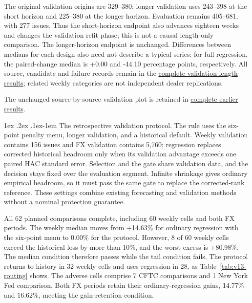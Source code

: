 \documentclass[10pt,a4paper]{article}
\makeatletter
\renewcommand\paragraph{\@startsection{paragraph}{4}{\z@}%
  {1ex \@plus .2ex \@minus .1ex}{-1em}%
  {\normalfont\normalsize\bfseries}}
\makeatother
\begin{document}
The original validation origins are 329--380; longer validation uses 243--398 at the short horizon and 225--380 at the longer horizon. Evaluation remains 405--681, with 277 issues. Thus the short-horizon endpoint also advances eighteen weeks and changes the validation refit phase; this is not a causal length-only comparison. The longer-horizon endpoint is unchanged. Differences between medians for each design also need not describe a typical series: for full regression, the paired-change median is +0.00 and -44.10 percentage points, respectively. All source, candidate and failure records remain in the \href{https://github.com/ByronLi0207/financial-mathematics-paper-20261020/tree/revision-v13/results/v13/nyfed-validation}{complete validation-length results}; related weekly categories are not independent dealer replications.

The unchanged source-by-source validation plot is retained in \href{https://github.com/ByronLi0207/financial-mathematics-paper-20261020/blob/submission-final/EXTENDED_RESULTS.md#asmbi-extended-s38}{complete earlier results}.


\FloatBarrier
\paragraph{The retrospective validation protocol.}
The rule uses the six-point penalty menu, longer validation, and a historical default. Weekly validation contains 156 issues and FX validation contains 5,760; regression replaces corrected historical headroom only when its validation advantage exceeds one paired HAC standard error. Selection and the gate share validation data, and the decision stays fixed over the evaluation segment. Infinite shrinkage gives ordinary empirical headroom, so it must pass the same gate to replace the corrected-rank reference. These settings combine existing forecasting and validation methods without a nominal protection guarantee.

All 62 planned comparisons complete, including 60 weekly cells and both FX periods. The weekly median moves from +14.63\% for ordinary regression with the six-point menu to 0.00\% for the protocol. However, 8 of 60 weekly cells exceed the historical loss by more than 10\%, and the worst excess is +80.98\%. The median condition therefore passes while the tail condition fails. The protocol returns to history in 32 weekly cells and uses regression in 28, as Table~\ref{tab:v13-routing} shows. The adverse cells comprise 7 CFTC comparisons and 1 New York Fed comparison. Both FX periods retain their ordinary-regression gains, 14.77\% and 16.62\%, meeting the gain-retention condition.
\end{document}
